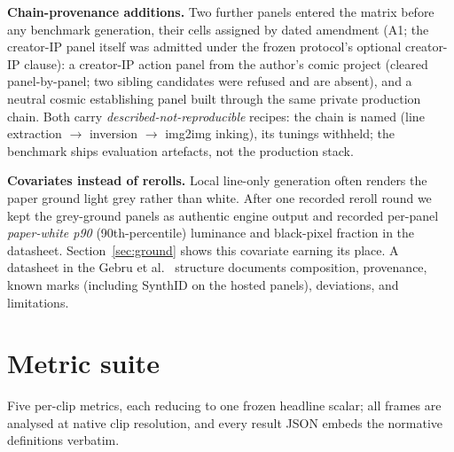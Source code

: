 \documentclass[11pt]{article}
\begin{document}
\textbf{Chain-provenance additions.} Two further panels entered the matrix before any
benchmark generation, their cells assigned by dated amendment (A1; the
creator-IP panel itself was admitted under the frozen protocol's optional
creator-IP clause): a creator-IP action panel
from the author's comic project (cleared panel-by-panel; two sibling
candidates were refused and are absent), and a neutral cosmic establishing
panel built through the same private production chain. Both carry
\emph{described-not-reproducible} recipes: the chain is named (line
extraction $\to$ inversion $\to$ img2img inking), its tunings withheld;
the benchmark ships evaluation artefacts, not the production stack.

\textbf{Covariates instead of rerolls.} Local line-only generation often
renders the paper ground light grey rather than white. After one recorded
reroll round we kept the grey-ground panels as authentic engine output and
recorded per-panel \emph{paper-white p90} (90th-percentile) luminance and black-pixel fraction
in the datasheet. Section~\ref{sec:ground} shows this covariate earning its
place. A datasheet in the Gebru et al.~\cite{gebru2021datasheets} structure
documents composition, provenance, known marks (including SynthID on the
hosted panels), deviations, and limitations.

\section{Metric suite}
\label{sec:metrics}

Five per-clip metrics, each reducing to one frozen headline scalar; all
frames are analysed at native clip resolution, and every result JSON embeds
the normative definitions verbatim.
\end{document}
